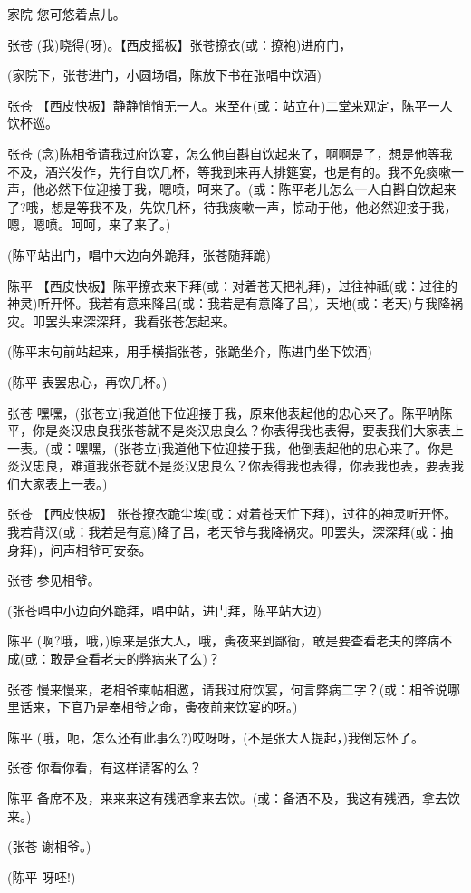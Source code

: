 家院 您可悠着点儿。

张苍 (我)晓得(呀)。【西皮摇板】张苍撩衣(或：撩袍)进府门，

(家院下，张苍进门，小圆场唱，陈放下书在张唱中饮酒)

张苍
【西皮快板】静静悄悄无一人。来至在(或：站立在)二堂来观定，陈平一人饮杯巡。

张苍
(念)陈相爷请我过府饮宴，怎么他自斟自饮起来了，啊啊是了，想是他等我不及，酒兴发作，先行自饮几杯，等我到来再大排筵宴，也是有的。我不免痰嗽一声，他必然下位迎接于我，嗯喷，呵来了。(或：陈平老儿怎么一人自斟自饮起来了?哦，想是等我不及，先饮几杯，待我痰嗽一声，惊动于他，他必然迎接于我，嗯，嗯喷。呵呵，来了来了。)

(陈平站出门，唱中大边向外跪拜，张苍随拜跪)

陈平
【西皮快板】陈平撩衣来下拜(或：对着苍天把礼拜)，过往神祗(或：过往的神灵)听开怀。我若有意来降吕(或：我若是有意降了吕)，天地(或：老天)与我降祸灾。叩罢头来深深拜，我看张苍怎起来。

(陈平末句前站起来，用手横指张苍，张跪坐介，陈进门坐下饮酒)

(陈平 表罢忠心，再饮几杯。)

张苍
嘿嘿，(张苍立)我道他下位迎接于我，原来他表起他的忠心来了。陈平呐陈平，你是炎汉忠良我张苍就不是炎汉忠良么？你表得我也表得，要表我们大家表上一表。(或：嘿嘿，(张苍立)我道他下位迎接于我，他倒表起他的忠心来了。你是炎汉忠良，难道我张苍就不是炎汉忠良么？你表得我也表得，你表我也表，要表我们大家表上一表。)

张苍 【西皮快板】
张苍撩衣跪尘埃(或：对着苍天忙下拜)，过往的神灵听开怀。我若背汉(或：我若是有意)降了吕，老天爷与我降祸灾。叩罢头，深深拜(或：抽身拜)，问声相爷可安泰。

张苍 参见相爷。

(张苍唱中小边向外跪拜，唱中站，进门拜，陈平站大边)

陈平
(啊?哦，哦，)原来是张大人，哦，夤夜来到鄙衙，敢是要查看老夫的弊病不成(或：敢是查看老夫的弊病来了么)？

张苍
慢来慢来，老相爷柬帖相邀，请我过府饮宴，何言弊病二字？(或：相爷说哪里话来，下官乃是奉相爷之命，夤夜前来饮宴的呀。)

陈平 (哦，呃，怎么还有此事么?)哎呀呀，(不是张大人提起，)我倒忘怀了。

张苍 你看你看，有这样请客的么？

陈平
备席不及，来来来这有残酒拿来去饮。(或：备酒不及，我这有残酒，拿去饮来。)

(张苍 谢相爷。)

(陈平 呀呸!)

